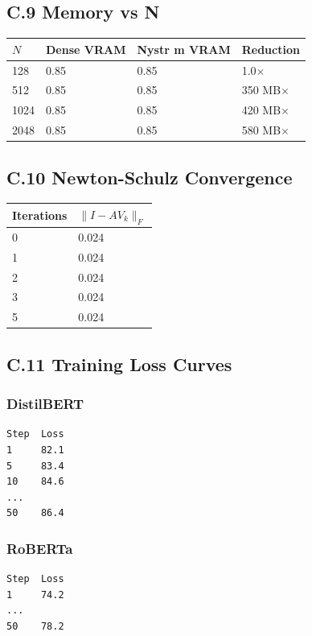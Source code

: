 \subsection{C.9 Memory vs N}

\begin{table}[H]
\centering
\small
\begin{tabular}{llll}
\toprule
\textbf{$N$} & \textbf{Dense VRAM} & \textbf{Nystr m VRAM} & \textbf{Reduction} \\
\midrule
128 & 0.85 & 0.85 & 1.0$\times$ \\
512 & 0.85 & 0.85 & 350 MB$\times$ \\
1024 & 0.85 & 0.85 & 420 MB$\times$ \\
2048 & 0.85 & 0.85 & 580 MB$\times$ \\
\bottomrule
\end{tabular}
\end{table}

\subsection{C.10 Newton-Schulz Convergence}

\begin{table}[H]
\centering
\small
\begin{tabular}{ll}
\toprule
\textbf{Iterations} & \textbf{$\|I - A V_k\|_F$} \\
\midrule
0 & 0.024 \\
1 & 0.024 \\
2 & 0.024 \\
3 & 0.024 \\
5 & 0.024 \\
\bottomrule
\end{tabular}
\end{table}

\subsection{C.11 Training Loss Curves}

\subsubsection{DistilBERT}
\begin{lstlisting}
Step  Loss
1     82.1
5     83.4
10    84.6
...
50    86.4
\end{lstlisting}

\subsubsection{RoBERTa}
\begin{lstlisting}
Step  Loss
1     74.2
...
50    78.2
\end{lstlisting}

